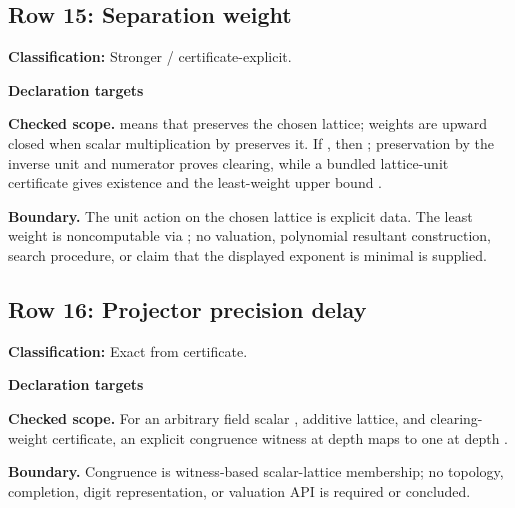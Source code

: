 \subsection{Row 15: Separation weight}
\label{row:15}
\textbf{Classification:} Stronger / certificate-explicit.
\par\smallskip\textbf{Declaration targets}\par
{\small\noindent{}\par}
{\small\noindent{}\par}
{\small\noindent{}\par}
{\small\noindent{}\par}
{\small\noindent{}\par}
{\small\noindent{}\par}
{\small\noindent{}\par}
{\small\noindent{}\par}
{\small\noindent{}\par}
{\small\noindent{}\par}
{\small\noindent{}\par}
\smallskip\textbf{Checked scope.}  means that  preserves the chosen lattice; weights are upward closed when scalar multiplication by  preserves it. If , then ; preservation by the inverse unit and numerator proves clearing, while a bundled lattice-unit certificate gives existence and the least-weight upper bound .
\par\smallskip\textbf{Boundary.} The unit action on the chosen lattice is explicit data. The least weight is noncomputable via ; no valuation, polynomial resultant construction, search procedure, or claim that the displayed exponent is minimal is supplied.
\medskip
{}
\subsection{Row 16: Projector precision delay}
\label{row:16}
\textbf{Classification:} Exact from certificate.
\par\smallskip\textbf{Declaration targets}\par
{\small\noindent{}\par}
{\small\noindent{}\par}
\smallskip\textbf{Checked scope.} For an arbitrary field scalar , additive lattice, and clearing-weight certificate, an explicit congruence witness at depth  maps to one at depth .
\par\smallskip\textbf{Boundary.} Congruence is witness-based scalar-lattice membership; no topology, completion, digit representation, or valuation API is required or concluded.
\medskip
{}
